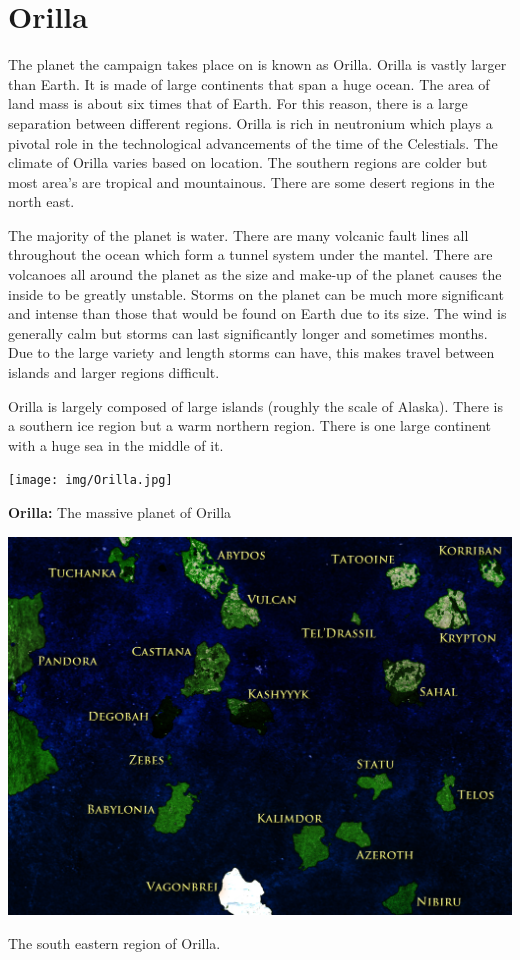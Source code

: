 \section{Orilla}

The planet the campaign takes place on is known as Orilla. Orilla is vastly larger than Earth. It is made of large continents that span a huge ocean. The area of land mass is about six times that of Earth. For this reason, there is a large separation between different regions. Orilla is rich in neutronium which plays a pivotal role in the technological advancements of the time of the Celestials. The climate of Orilla varies based on location. The southern regions are colder but most area's are tropical and mountainous. There are some desert regions in the north east.

The majority of the planet is water. There are many volcanic fault lines all throughout the ocean which form a tunnel system under the mantel. There are volcanoes all around the planet as the size and make-up of the planet causes the inside to be greatly unstable. Storms on the planet can be much more significant and intense than those that would be found on Earth due to its size. The wind is generally calm but storms can last significantly longer and sometimes months. Due to the large variety and length storms can have, this makes travel between islands and larger regions difficult.

Orilla is largely composed of large islands (roughly the scale of Alaska). There is a southern ice region but a warm northern region. There is one large continent with a huge sea in the middle of it.

\begin{center}
	\texttt{[image: img/Orilla.jpg]}
	
	{\textbf{Orilla:} The massive planet of Orilla}
\end{center}

\begin{center}
	\includegraphics[width=0.7\linewidth]{img/Orilla_SE.jpg}
	
	{The south eastern region of Orilla.}
\end{center}

